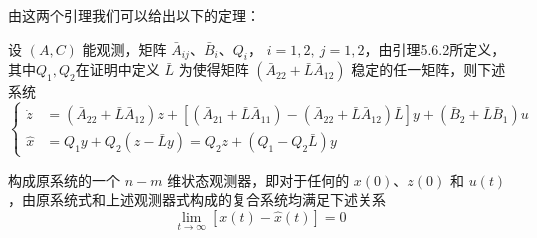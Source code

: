 由这两个引理我们可以给出以下的定理：
\begin{theorem}
    设 $(A,C)$ 能观测，矩阵 $\bar{A}_{ij}$、$\bar{B}_i$、$Q_i$，
    $i=1,2,\ j=1,2$，由引理5.6.2所定义，其中$Q_1,Q_2$在证明中定义
    $\bar{L}$ 为使得矩阵 $(\bar{A}_{22}+\bar{L}\bar{A}_{12})$
    稳定的任一矩阵，则下述系统
    \label{theorem5.6.6}
    \[
    \left\{
    \begin{aligned}
    \dot{z}
    &=
    (\bar{A}_{22}+\bar{L}\bar{A}_{12})z
    +
    \left[
    (\bar{A}_{21}+\bar{L}\bar{A}_{11})
    -
    (\bar{A}_{22}+\bar{L}\bar{A}_{12})\bar{L}
    \right]y
    +
    (\bar{B}_2+\bar{L}\bar{B}_1)u
    \\
    \hat{x}
    &=
    Q_1y+Q_2(z-\bar{L}y)
    =
    Q_2z+(Q_1-Q_2\bar{L})y
    \end{aligned}
    \right.
    \]

    构成原系统的一个 $n-m$ 维状态观测器，即对于任何的 $x(0)$、$z(0)$ 和
    $u(t)$，由原系统式和上述观测器式构成的复合系统均满足下述关系
    \[
    \lim_{t\to\infty}\left[x(t)-\hat{x}(t)\right]=0
    \]
\end{theorem}

